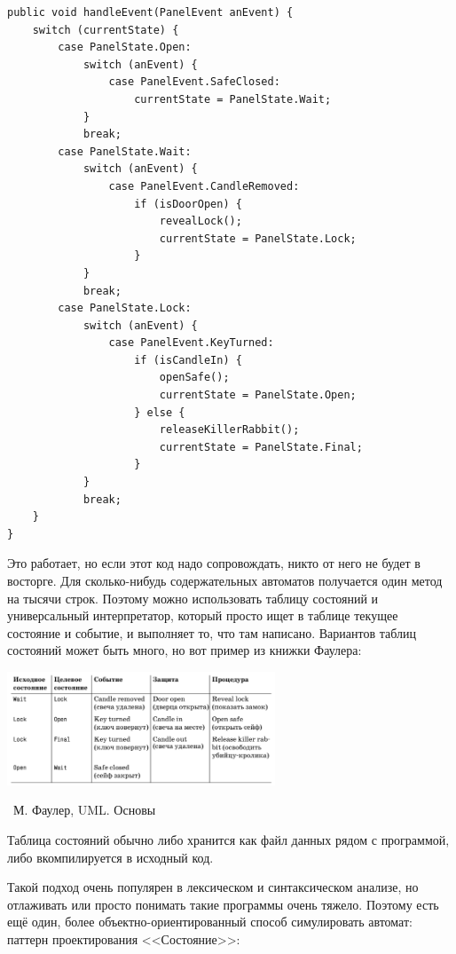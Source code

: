 \documentclass[a5paper]{article}
\newcommand{\attribution}[1] {
    \vspace{-5mm}\begin{flushright}\begin{scriptsize}%
    {\textcopyright\, #1}\end{scriptsize}\end{flushright}
}
\begin{document}
\begin{verbatim}
public void handleEvent(PanelEvent anEvent) {
    switch (currentState) {
        case PanelState.Open:
            switch (anEvent) {
                case PanelEvent.SafeClosed:
                    currentState = PanelState.Wait;
            }
            break;
        case PanelState.Wait:
            switch (anEvent) {
                case PanelEvent.CandleRemoved:
                    if (isDoorOpen) {
                        revealLock();
                        currentState = PanelState.Lock;
                    }
            }
            break;
        case PanelState.Lock:
            switch (anEvent) {
                case PanelEvent.KeyTurned:
                    if (isCandleIn) {
                        openSafe();
                        currentState = PanelState.Open;
                    } else {
                        releaseKillerRabbit();
                        currentState = PanelState.Final;
                    }
            }
            break;
    }
}
\end{verbatim}

Это работает, но если этот код надо сопровождать, никто от него не будет в восторге. Для сколько-нибудь содержательных автоматов получается один метод на тысячи строк. Поэтому можно использовать таблицу состояний и универсальный интерпретатор, который просто ищет в таблице текущее состояние и событие, и выполняет то, что там написано. Вариантов таблиц состояний может быть много, но вот пример из книжки Фаулера:

\begin{center}
    \includegraphics[width=0.6\textwidth]{stateTransitionStateTable.png}
    \attribution{М. Фаулер, UML. Основы}
\end{center}

Таблица состояний обычно либо хранится как файл данных рядом с программой, либо вкомпилируется в исходный код. 

Такой подход очень популярен в лексическом и синтаксическом анализе, но отлаживать или просто понимать такие программы очень тяжело. Поэтому есть ещё один, более объектно-ориентированный способ симулировать автомат: паттерн проектирования <<Состояние>>:
\end{document}
